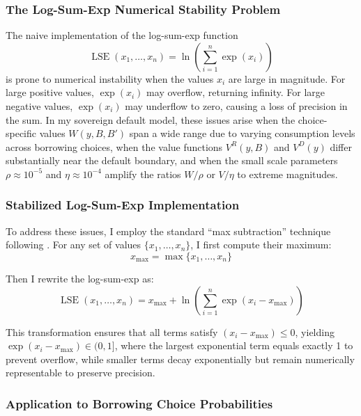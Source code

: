 \documentclass[12pt]{article}
\theoremstyle{plain}
\begin{document}
\subsubsection{The Log-Sum-Exp Numerical Stability Problem}

The naive implementation of the log-sum-exp function
\begin{equation}\label{eq:lse_naive}
	\operatorname{LSE}(x_1, \ldots, x_n) = \ln\left(\sum_{i=1}^n \exp(x_i)\right)
\end{equation}
is prone to numerical instability when the values $x_i$ are large in magnitude. For large positive values, $\exp(x_i)$ may overflow, returning infinity. For large negative values, $\exp(x_i)$ may underflow to zero, causing a loss of precision in the sum. In my sovereign default model, these issues arise when the choice-specific values $W(y,B,B')$ span a wide range due to varying consumption levels across borrowing choices, when the value functions $V^R(y,B)$ and $V^D(y)$ differ substantially near the default boundary, and when the small scale parameters $\rho \approx 10^{-5}$ and $\eta \approx 10^{-4}$ amplify the ratios $W/\rho$ or $V/\eta$ to extreme magnitudes.

\subsubsection{Stabilized Log-Sum-Exp Implementation}

To address these issues, I employ the standard ``max subtraction'' technique
following \citep{MIHALACHEOREEF2024}. For any set of values $\{x_1, \ldots,
	x_n\}$, I first compute their maximum:
\begin{equation}\label{eq:x_max}
	x_{\max} = \max\{x_1, \ldots, x_n\}
\end{equation}

Then I rewrite the log-sum-exp as:
\begin{equation}\label{eq:lse_stable}
	\operatorname{LSE}(x_1, \ldots, x_n) = x_{\max} + \ln\left(\sum_{i=1}^n \exp(x_i - x_{\max})\right)
\end{equation}

This transformation ensures that all terms satisfy $(x_i - x_{\max}) \leq 0$,
yielding $\exp(x_i - x_{\max}) \in (0,1]$, where the largest exponential term
equals exactly 1 to prevent overflow, while smaller terms decay exponentially
but remain numerically representable to preserve precision.

\subsubsection{Application to Borrowing Choice Probabilities}
\end{document}
